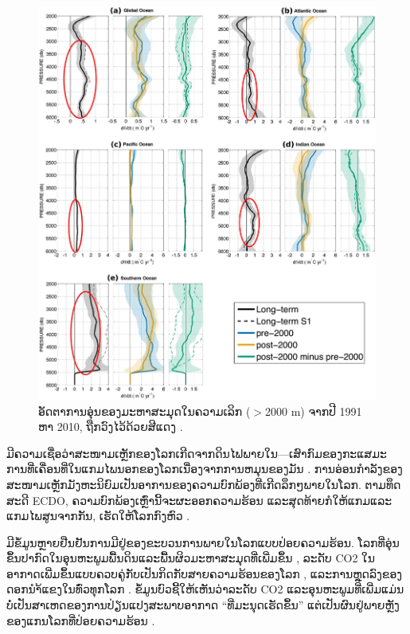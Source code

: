 \documentclass[10pt,twocolumn,letterpaper]{article}
\begin{document}
\begin{figure}[t]
\begin{center}
   \includegraphics[width=1\linewidth]{ocean-highlight.jpg}
\end{center}
   \caption{ອັດຕາການອຸ່ນຂອງມະຫາສະມຸດໃນຄວາມເລິກ ($>$2000 m) ຈາກປີ 1991 ຫາ 2010, ຖືກວົງໄວ້ດ້ວຍສີແດງ \cite{132}.}
\label{fig:15}
\label{fig:onecol}
\end{figure}

ມີຄວາມເຊື່ອວ່າສະໜາມເຫຼັກຂອງໂລກເກີດຈາກດິນໄຟພາຍໃນ—ເສົາກົມຂອງກະແສມະການທີ່ເຄື່ອນທີ່ໃນແກມໄພນອກຂອງໂລກເນື່ອງຈາກການຫມຸນຂອງມັນ \cite{123}. ການອ່ອນກຳລັງຂອງສະໜາມເຫຼັກມັງຫະນິຍົມເປັນອາການຂອງຄວາມບົກພ້ອງທີ່ເກີດລຶກໆພາຍໃນໂລກ. ຕາມທຶດສະດີ ECDO, ຄວາມບົກພ້ອງເຫຼົ່ານີ້ຈະຜະອອກຄວາມຮ້ອນ ແລະສຸດທ້າຍກໍໃຫ້ແກມແລະແກມໄພສູນຈາກກັນ, ເຮັດໃຫ້ໂລກກົງຫົວ \cite{1}.

ມີຂໍ້ມູນຫຼາຍຢືນຢັນການມີຢູ່ຂອງຂະບວນການພາຍໃນໂລກແບບປ່ອຍຄວາມຮ້ອນ. ໂລກທີ່ອຸ່ນຂຶ້ນປາກົດໃນອຸນຫະພູມພື້ນດິນແລະພື້ນຜິວມະຫາສະມຸດທີ່ເພີ່ມຂຶ້ນ \cite{127,128}, ລະດັບ CO2 ໃນອາກາດເພີ່ມຂຶ້ນແບບຄວບຄູ່ກັບເປັນກິດກັບສາຍຄວາມຮ້ອນຂອງໂລກ \cite{129,130}, ແລະການຫຼຸດລົງຂອງດອກນຳ້ແຂງໃນທົ່ວທຸກໂລກ \cite{131}. ຂໍ້ມູນບົວຊີ້ໃຫ້ເຫັນວ່າລະດັບ CO2 ແລະອຸນຫະພູມທີ່ເພີ່ມແມ່ນບໍ່ເປັນສາເຫດຂອງການປ່ຽນແປງສະພາບອາກາດ “ທີ່ມະນຸດເຮັດຂຶ້ນ” ແຕ່ເປັນຜົນຢູ່ພາຍຫຼັງຂອງແກນໂລກທີ່ປ່ອຍຄວາມຮ້ອນ \cite{129}.
\end{document}
